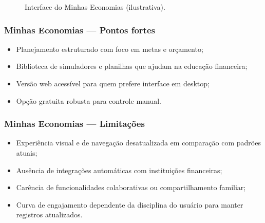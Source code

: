 \begin{figure}[H]
\centering
{}
\caption{Interface do Minhas Economias (ilustrativa).}
\label{fig:minhas_economias}
\end{figure}

\subsubsection*{Minhas Economias — Pontos fortes}
\begin{itemize}
    \item Planejamento estruturado com foco em metas e orçamento;
    \item Biblioteca de simuladores e planilhas que ajudam na educação financeira;
    \item Versão web acessível para quem prefere interface em desktop;
    \item Opção gratuita robusta para controle manual.
\end{itemize}

\subsubsection*{Minhas Economias — Limitações}
\begin{itemize}
    \item Experiência visual e de navegação desatualizada em comparação com padrões atuais;
    \item Ausência de integrações automáticas com instituições financeiras;
    \item Carência de funcionalidades colaborativas ou compartilhamento familiar;
    \item Curva de engajamento dependente da disciplina do usuário para manter registros atualizados.
\end{itemize}

